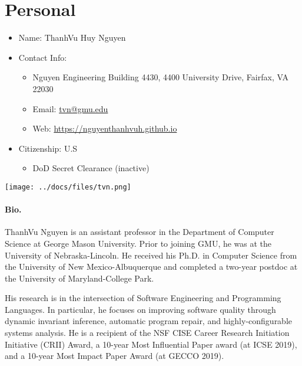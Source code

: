 \documentclass[11pt]{article}
\makeatletter
\newcommand{\myname}{ThanhVu Huy Nguyen}
\newcommand{\mynamevn}{Nguy$\tilde{\hat{\text{e}}}$n Huy ThanhV$\tilde{\text{u}}$}
\newcommand{\myemailwork}{tvn@gmu.edu}
\newcommand{\myweb}{https://nguyenthanhvuh.github.io}
\newcommand{\emailweb}{
\item Email: \href{mailto:\myemailwork}{\myemailwork}
\item Web: \url{\myweb}
}
\makeatother
\begin{document}
{
  \section{Personal}

  \begin{minipage}{.8\textwidth}
    \begin{itemize}
    \item Name: \myname{}
    \item Contact Info:
      \begin{itemize}
        \item Nguyen Engineering Building 4430, 4400 University Drive, Fairfax, VA 22030
        \emailweb{}
      \end{itemize}
    \item Citizenship: U.S
      \begin{itemize}
      \item DoD Secret Clearance (inactive)
      \end{itemize}
    \end{itemize}
  \end{minipage}
  \begin{minipage}{.3\textwidth}
    \texttt{[image: ../docs/files/tvn.png]}
  \end{minipage}

  \paragraph{Bio.} ThanhVu Nguyen is an assistant professor in the Department of Computer Science at George Mason University. 
  Prior to joining GMU, he was at the University of Nebraska-Lincoln. He received his Ph.D. in Computer Science from the University of New Mexico-Albuquerque and completed a two-year postdoc at the University of Maryland-College Park.

  His research is in the intersection of Software Engineering and Programming Languages. In particular, he focuses on improving software quality through dynamic invariant inference,  automatic program repair, and highly-configurable systems analysis.
He is a recipient of the NSF CISE Career Research Initiation Initiative (CRII) Award, a 10-year Most Influential Paper award (at ICSE 2019), and a 10-year Most Impact Paper Award (at GECCO 2019).
}
\end{document}
